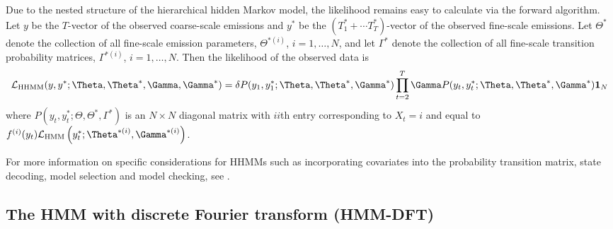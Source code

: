 Due to the nested structure of the hierarchical hidden Markov model, the likelihood remains easy to calculate via the forward algorithm.
%
Let $y$ be the $T$-vector of the observed coarse-scale emissions and
$y^*$ be the $(T_1^* + \cdots T_T^*)$-vector of the observed fine-scale emissions.
%
Let $\Theta^*$ denote the collection of all fine-scale emission parameters,
$\Theta^{*(i)}$, $i=1,\ldots, N$, and let $\Gamma^*$ denote the collection of all fine-scale transition probability matrices, $\Gamma^{*(i)}$, $i=1,\ldots, N$.
%
Then the likelihood of the observed data is
%
\[
\calL_{\text{HHMM}}(y,y^*;\Theta,\Theta^*,\Gamma,\Gamma^*) = \delta P(y_1,y_1^*;\Theta,\Theta^*,\Gamma^*) \prod_{t=2}^T \Gamma P(y_t,y_t^*;\Theta,\Theta^*,\Gamma^*) \mathbf{1}_N
\]
%
where $P(y_t,y_t^*;\Theta,\Theta^*,\Gamma^*)$ is an $N \times N$ diagonal matrix with $ii$th entry corresponding to $X_t=i$ and equal to 
$f^{(i)}(y_t)\calL_{\text{HMM}}\left(y_t^*;\Theta^{*(i)},
\Gamma^{*(i)}\right)$. 

For more information on specific considerations for HHMMs such as incorporating covariates into the probability transition matrix, state decoding, model selection and model checking, see \citep{Adam:2019}.

\subsection{The HMM with discrete Fourier transform (HMM-DFT)}
\label{subsec:STFT}

